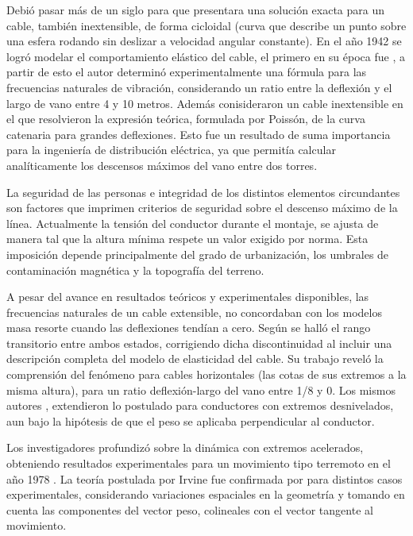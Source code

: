 Debió pasar más de un siglo para que \cite{routh1955dynamics} presentara una solución exacta para un cable, también inextensible, de forma cicloidal (curva que describe un punto sobre una esfera rodando sin deslizar a velocidad angular constante). En el año 1942 se logró modelar el comportamiento elástico del cable, el primero en su época fue \cite{Kloppel1942}, a partir de esto el autor \cite{Pugsley1949} determinó experimentalmente una fórmula para las frecuencias naturales de vibración, considerando un ratio entre la deflexión y el largo de vano entre 4 y 10 metros. Además \cite{Saxon1953} conisideraron un cable inextensible en el que resolvieron la expresión teórica, formulada por Poissón, de la curva catenaria para grandes deflexiones. Esto fue un resultado de suma importancia para la ingeniería de distribución eléctrica, ya que permitía calcular analíticamente los descensos máximos del vano entre dos torres.

La seguridad de las personas e integridad de los distintos elementos circundantes son factores que imprimen criterios de seguridad sobre el descenso máximo de la línea. Actualmente la tensión del conductor durante el montaje, se ajusta de manera tal que la altura mínima respete un valor exigido por norma. Esta imposición depende principalmente del grado de urbanización, los umbrales de contaminación magnética y la topografía del terreno.   

A pesar del avance en resultados teóricos y experimentales disponibles, las frecuencias naturales de un cable extensible, no concordaban con los modelos masa resorte cuando las deflexiones tendían a cero. Según \cite{Irvine1974} se halló el rango transitorio entre ambos estados, corrigiendo dicha discontinuidad al incluir una descripción completa del modelo de elasticidad del cable. Su trabajo reveló la comprensión del fenómeno para cables horizontales (las cotas de sus extremos a la misma altura), para un ratio deflexión-largo del vano entre 1/8 y 0. Los mismos autores \cite{Irvine1974}, extendieron lo postulado para conductores con extremos desnivelados, aun bajo la hipótesis de que el peso se aplicaba perpendicular al conductor.

Los investigadores \cite{Irvine1976} profundizó sobre la dinámica con extremos acelerados, obteniendo resultados experimentales para un movimiento tipo terremoto en el año 1978 \citep{Irvine1978}. La teoría postulada por Irvine fue confirmada por \cite{Triantafyllou1984} para distintos casos experimentales,  considerando variaciones espaciales en la geometría y tomando en cuenta las componentes del vector peso, colineales con el vector tangente al movimiento.

